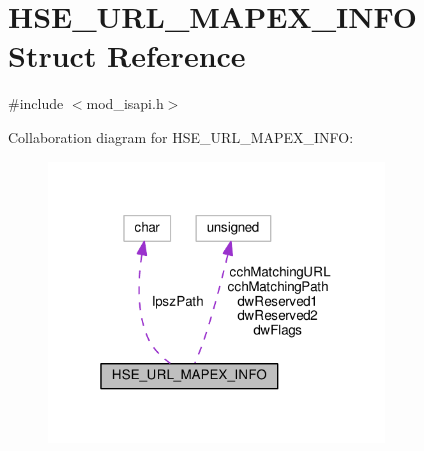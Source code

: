 \hypertarget{structHSE__URL__MAPEX__INFO}{}\section{H\+S\+E\+\_\+\+U\+R\+L\+\_\+\+M\+A\+P\+E\+X\+\_\+\+I\+N\+FO Struct Reference}
\label{structHSE__URL__MAPEX__INFO}


{\ttfamily \#include $<$mod\+\_\+isapi.\+h$>$}



Collaboration diagram for H\+S\+E\+\_\+\+U\+R\+L\+\_\+\+M\+A\+P\+E\+X\+\_\+\+I\+N\+FO\+:
\nopagebreak
\begin{figure}[H]
\begin{center}
\leavevmode
\includegraphics[width=253pt]{structHSE__URL__MAPEX__INFO__coll__graph}
\end{center}
\end{figure}
